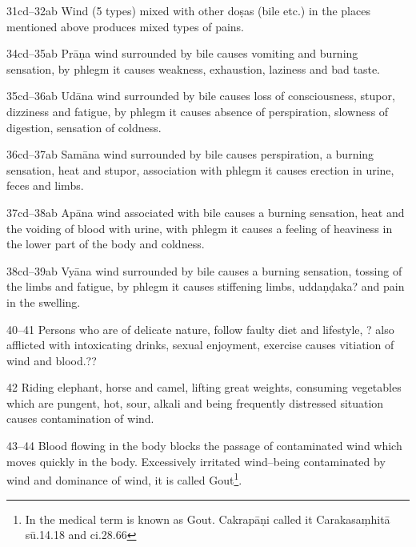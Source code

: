 \begin{translation}
\item[31cd--32ab] Wind (5 types) mixed with other doṣas (bile etc.) in the 
places mentioned above produces mixed types of pains.

\item[34cd--35ab] Prāṇa wind surrounded by bile causes vomiting and burning 
sensation, by phlegm it causes weakness, exhaustion, laziness and bad taste. 

\item[35cd--36ab] Udāna wind surrounded by bile causes loss of 
consciousness, stupor, dizziness and fatigue, by phlegm it causes absence of 
perspiration, slowness of digestion, sensation of coldness.

\item[36cd--37ab] Samāna wind surrounded by bile causes perspiration, a 
burning sensation, heat and stupor, association with phlegm it causes erection 
in 
urine, feces and limbs.  

\item[37cd--38ab] Apāna wind associated with bile causes a burning sensation, 
heat and the voiding of blood with urine, with phlegm it causes a feeling of 
heaviness in the lower part of the body and coldness.

\item[38cd--39ab] Vyāna wind surrounded by bile causes a burning sensation, 
tossing of the limbs and fatigue, by phlegm it causes stiffening limbs, 
uddaṇḍaka? and pain in the swelling.

\item[40--41] Persons who are of delicate nature, follow faulty diet and lifestyle, ? also afflicted with intoxicating drinks, 	sexual enjoyment, exercise causes vitiation of wind and blood.??

\item[42] Riding elephant, horse and camel, lifting great weights, consuming vegetables which are pungent, hot, sour, alkali and being frequently distressed situation causes contamination of wind. 

\item[43--44] Blood flowing in the body blocks the passage of contaminated wind which moves quickly in the body. Excessively irritated wind--being contaminated by wind and dominance of wind, it is called  Gout\footnote{In the medical term  is known as Gout. Cakrapāṇi called it  Carakasaṃhitā sū.14.18 and ci.28.66}.


\end{translation}
